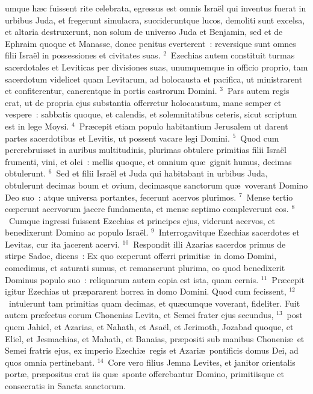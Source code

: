 \bchapter
{}umque h\ae c fuissent rite celebrata, egressus est omnis Isra\"el qui inventus fuerat in urbibus Juda, et fregerunt simulacra, succideruntque lucos, demoliti sunt excelsa, et altaria destruxerunt, non solum de universo Juda et Benjamin, sed et de Ephraim quoque et Manasse, donec penitus everterent~: reversique sunt omnes filii Isra\"el in possessiones et civitates suas.
${}^{2}$~Ezechias autem constituit turmas sacerdotales et Leviticas per divisiones suas, unumquemque in officio proprio, tam sacerdotum videlicet quam Levitarum, ad holocausta et pacifica, ut ministrarent et confiterentur, canerentque in portis castrorum Domini.
${}^{3}$~Pars autem regis erat, ut de propria ejus substantia offerretur holocaustum, mane semper et vespere~: sabbatis quoque, et calendis, et solemnitatibus ceteris, sicut scriptum est in lege Moysi.
${}^{4}$~Pr\ae cepit etiam populo habitantium Jerusalem ut darent partes sacerdotibus et Levitis, ut possent vacare legi Domini.
${}^{5}$~Quod cum percrebruisset in auribus multitudinis, plurimas obtulere primitias filii Isra\"el frumenti, vini, et olei~: mellis quoque, et omnium qu\ae\ gignit humus, decimas obtulerunt.
${}^{6}$~Sed et filii Isra\"el et Juda qui habitabant in urbibus Juda, obtulerunt decimas boum et ovium, decimasque sanctorum qu\ae\ voverant Domino Deo suo~: atque universa portantes, fecerunt acervos plurimos.
${}^{7}$~Mense tertio cœperunt acervorum jacere fundamenta, et mense septimo compleverunt eos.
${}^{8}$~Cumque ingressi fuissent Ezechias et principes ejus, viderunt acervos, et benedixerunt Domino ac populo Isra\"el.
${}^{9}$~Interrogavitque Ezechias sacerdotes et Levitas, cur ita jacerent acervi.
${}^{10}$~Respondit illi Azarias sacerdos primus de stirpe Sadoc, dicens~: Ex quo cœperunt offerri primiti\ae\ in domo Domini, comedimus, et saturati sumus, et remanserunt plurima, eo quod benedixerit Dominus populo suo~: reliquarum autem copia est ista, quam cernis.
${}^{11}$~Pr\ae cepit igitur Ezechias ut pr\ae pararent horrea in domo Domini. Quod cum fecissent,
${}^{12}$~intulerunt tam primitias quam decimas, et qu\ae cumque voverant, fideliter. Fuit autem pr\ae fectus eorum Chonenias Levita, et Semei frater ejus secundus,
${}^{13}$~post quem Jahiel, et Azarias, et Nahath, et Asa\"el, et Jerimoth, Jozabad quoque, et Eliel, et Jesmachias, et Mahath, et Banaias, pr\ae positi sub manibus Choneni\ae\ et Semei fratris ejus, ex imperio Ezechi\ae\ regis et Azari\ae\ pontificis domus Dei, ad quos omnia pertinebant.
${}^{14}$~Core vero filius Jemna Levites, et janitor orientalis port\ae , pr\ae positus erat iis qu\ae\ sponte offerebantur Domino, primitiisque et consecratis in Sancta sanctorum.
